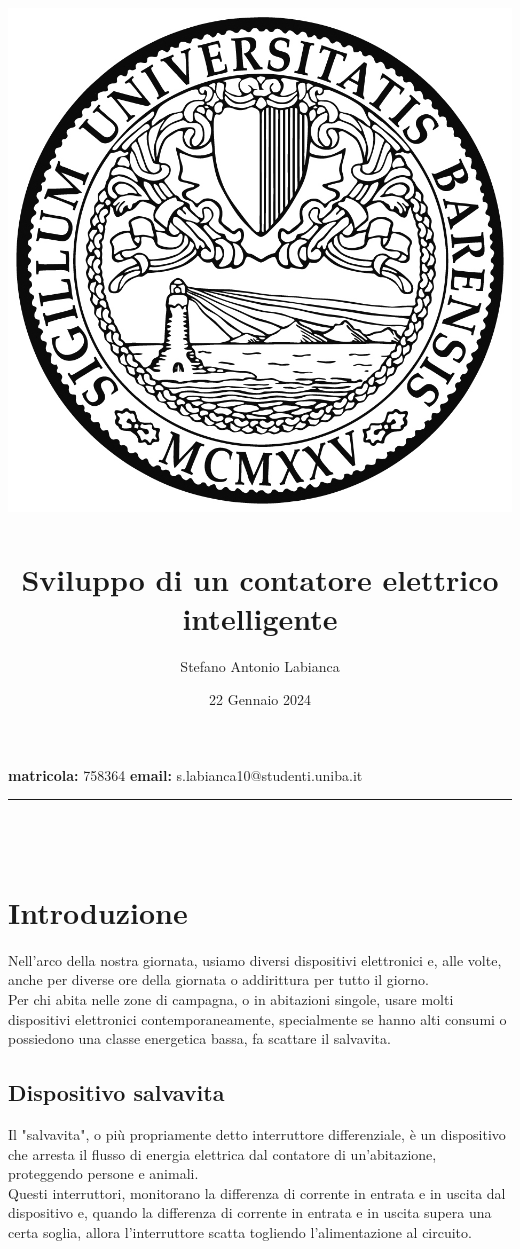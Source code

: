 \documentclass[12pt, letterpaper]{article}
\title{
    \includegraphics[scale=0.5]{unibalogo.jpg}~\\[1cm]
    \textbf{Sviluppo di un contatore elettrico intelligente}
}
\author{Stefano Antonio Labianca}
\date{22 Gennaio 2024}
\begin{document}
\maketitle


\textbf{matricola: } 758364
\hfill
\textbf{email: } s.labianca10@studenti.uniba.it

\par\noindent\rule{\textwidth}{0.4pt}~\\[5cm]

\tableofcontents ~\\[5cm]

\section{Introduzione}

Nell'arco della nostra giornata, usiamo diversi dispositivi elettronici e,
alle volte, anche per diverse ore della giornata o addirittura per tutto
il giorno. \\ \break
Per chi abita nelle zone di campagna, o in abitazioni singole, usare molti
dispositivi elettronici contemporaneamente, specialmente se hanno alti consumi o
possiedono una classe energetica bassa, fa scattare il salvavita.

\subsection{Dispositivo salvavita}

Il "salvavita", o più propriamente detto interruttore differenziale, è un dispositivo
che arresta il flusso di energia elettrica dal contatore di
un'abitazione, proteggendo persone e animali. \\ \break
Questi interruttori, monitorano la differenza di corrente in entrata
e in uscita dal dispositivo e, quando la differenza di corrente in entrata e in
uscita supera una certa soglia, allora l'interruttore scatta togliendo l'alimentazione
al circuito.
\end{document}
